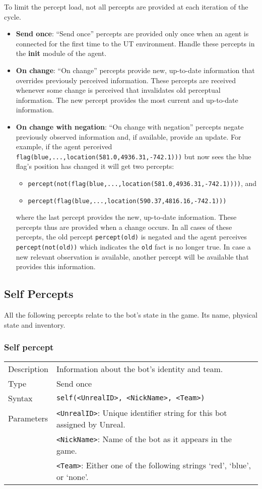 \documentclass[11pt,a4paper]{article}
\begin{document}
To limit the percept load, not all percepts are provided at each iteration of the cycle. 
\begin{itemize}
\item \textbf{Send once}: ``Send once'' percepts are provided only once when an agent is connected for the first time to the UT environment. Handle these percepts in the \textbf{init} module of the agent.
\item \textbf{On change}: ``On change'' percepts provide new, up-to-date information that overrides previously perceived information. These percepts are received whenever some change is perceived that invalidates old perceptual information. The new percept provides the most current and up-to-date information.
\item \textbf{On change with negation}: ``On change with negation'' percepts negate previously observed information and, if available, provide an update. For example, if the agent perceived \texttt{flag(blue,...,location(581.0,4936.31,-742.1)))} but now sees the blue flag's position has changed it will get two percepts:
\begin{itemize}
	\item \texttt{percept(not(flag(blue,...,location(581.0,4936.31,-742.1))))}, and
	\item \texttt{percept(flag(blue,...,location(590.37,4816.16,-742.1)))}
\end{itemize} where the last percept provides the new, up-to-date information. These percepts thus are provided when a change occurs. In all cases of these percepts, the old percept \texttt{percept(old)} is negated and the agent perceives \texttt{percept(not(old))} which indicates the \texttt{old} fact is no longer true. In case a new relevant observation is available, another percept will be available that provides this information.
\end{itemize}

%
\subsection{Self Percepts}
%
All the following percepts relate to the bot's state in the game. Its name, physical state and inventory.

\subsubsection*{Self percept}
\begin{small}
\begin{tabular}{p{2cm}p{9cm}}
Description & Information about the bot's identity and team.\\
Type & Send once\\
Syntax & \verb|self(<UnrealID>, <NickName>, <Team>)|\\ 
Parameters &
\verb|<UnrealID>|: Unique identifier string for this bot assigned by Unreal.\\
& \verb|<NickName>|: Name of the bot as it appears in the game.\\
& \verb|<Team>|: Either one of the following strings ‘red’, ‘blue’, or ‘none’.
\end{tabular}
\end{small}
\end{document}
